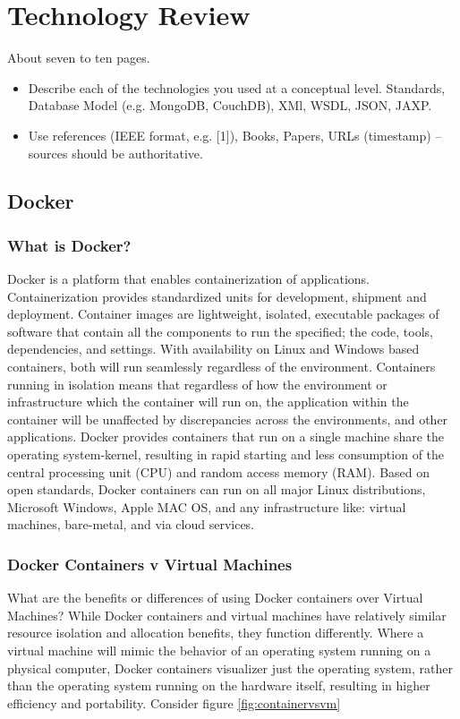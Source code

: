 \chapter{Technology Review}
About seven to ten pages.
\begin{itemize}
\item Describe each of the technologies you used at a conceptual level. Standards, Database Model (e.g. MongoDB, CouchDB), XMl, WSDL, JSON, JAXP.
\item Use references (IEEE format, e.g. [1]), Books, Papers, URLs (timestamp) – sources should be authoritative. 
\end{itemize}

\section{Docker}

\subsection{What is Docker?}
Docker is a platform that enables containerization of applications. Containerization provides standardized units for development, shipment and deployment. Container images are lightweight, isolated, executable packages of software that contain all the components to run the specified; the code, tools, dependencies, and settings. With availability on Linux and Windows based containers, both will run seamlessly regardless of the environment. Containers running in isolation means that regardless of how the environment or infrastructure which the container will run on, the application within the container will be unaffected by discrepancies across the environments, and other applications. Docker provides containers that run on a single machine share the operating system-kernel, resulting in rapid starting and less consumption of the central processing unit (CPU) and random access memory (RAM). Based on open standards, Docker containers can run on all major Linux distributions, Microsoft Windows, Apple MAC OS, and any infrastructure like: virtual machines, bare-metal, and via cloud services. 

\subsection{Docker Containers v Virtual Machines}
What are the benefits or differences of using Docker containers over Virtual Machines? 
While Docker containers and virtual machines have relatively similar resource isolation and allocation benefits, they function differently. Where a virtual machine will mimic the behavior of an operating system running on a physical computer, Docker containers visualizer just the operating system, rather than the operating system running on the hardware itself, resulting in higher efficiency and portability. Consider figure \ref{fig:containervsvm}

